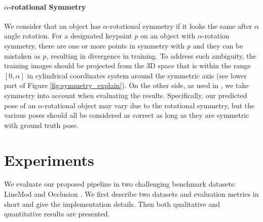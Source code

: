 \documentclass[10pt,twocolumn,letterpaper]{article}
\begin{document}
\paragraph{$\alpha$-rotational Symmetry} We consider that an object has $\alpha$-rotational symmetry if it looks the same after $\alpha$ angle rotation. For a designated keypoint $p$ on an object with $\alpha$-rotation symmetry, there are one or more points in symmetry with $p$ and they can be mistaken as $p$, resulting in divergence in training. To address such ambiguity, the training images should be projected from the 3D space that is within the range $[0,\alpha]$ in cylindrical coordinates system around the symmetric axis (see lower part of Figure \ref{fig:symmetry_explain}). On the other side, as used in \cite{7780735,Hinterstoisser:2012:MBT:2481913.2481959,tekin18}, we take symmetry into account when evaluating the results. Specifically, our predicted pose of an  $\alpha$-rotational object may vary due to the rotational symmetry, but the various poses should all be considered as correct as long as they are symmetric with ground truth pose.


\section{Experiments}

We evaluate our proposed pipeline in two challenging benchmark datasets: LineMod \cite{Hinterstoisser:2012:MBT:2481913.2481959} and Occlusion \cite{10.1007/978-3-319-10605-2_35}. We first describe two datasets and evaluation metrics in short and give the implementation details. Then both qualitative and quantitative results are presented.
\end{document}
